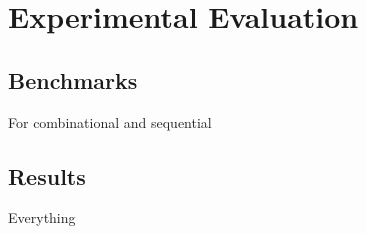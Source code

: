 \chapter{Experimental Evaluation}\label{chapter:ExpEval}

\section{Benchmarks}
For combinational and sequential

\section{Results}
Everything